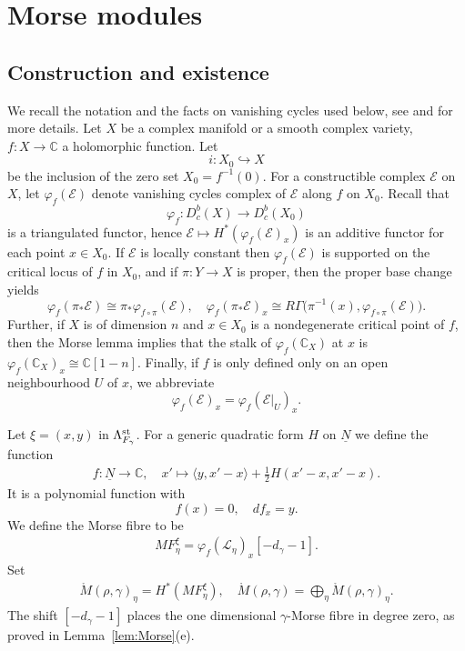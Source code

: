 \documentclass[11pt,reqno]{amsart}
\theoremstyle{definition}
\theoremstyle{remark}
\def\bbC{\mathbb C}
\def\dN{\underline N}
\def\calE{\mathcal E}
\begin{document}
\section{Morse modules}\label{sec:morse}

\subsection{Construction and existence}\label{subsec:vc}
We recall the notation and the facts on vanishing cycles used below, see \cite[\S4.2]{Dim04} and \cite[\S8.6]{KS90} for more details. 
Let $X$ be a complex
manifold or a smooth complex variety, $f:X\to\bbC$ a holomorphic function.
Let $$i:X_0\hookrightarrow X$$ 
be the inclusion of the zero set $X_0=f^{-1}(0)$.
For a constructible complex $\calE$ on $X$, let $\varphi_f(\calE)$
denote {vanishing cycles} complex of $\calE$ along $f$ on $X_0$.
Recall that 
$$\varphi_f:D^b_c(X)\to D^b_c(X_0)$$ is a triangulated functor, hence
$\calE\mapsto H^*(\varphi_f(\calE)_x)$ is an additive functor for each point $x\in X_0$.
If $\calE$ is locally constant then $\varphi_f(\calE)$ is supported on the critical locus of $f$ in $X_0$,
and if $\pi:Y\to X$ is proper, then the proper base change yields
$$\varphi_f(\pi_*\calE)\cong\pi_*\varphi_{f\circ\pi}(\calE)
,\quad
\varphi_f(\pi_*\calE)_x\cong R\Gamma\big(\pi^{-1}(x),\varphi_{f\circ\pi}(\calE)\big).$$
Further, if $X$ is  of dimension $n$ and $x\in X_0$ is a nondegenerate critical point of $f$, then the Morse lemma
implies that the stalk of $\varphi_f(\bbC_X)$ at $x$ is \(\varphi_f(\mathbb C_X)_x\cong\mathbb C[1-n]\). 
Finally, if $f$ is only defined only on an open neighbourhood $U$ of $x$, we abbreviate
$$\varphi_f(\calE)_x=\varphi_f(\calE|_U)_x.$$

Let $\xi=(x,y)$ in $\Lambda_{F_\gamma}^{\rm st}$. 
For a generic quadratic form $H$ on $\dN$ we define the function
\begin{align}\label{fH}
f:\dN\to\mathbb C,\quad
x'\mapsto\langle y,x'-x\rangle+\frac12H(x'-x,x'-x).\end{align} 
It is a polynomial function with 
$$f(x)=0,\quad df_x=y.$$
We define the Morse fibre to be
\begin{align}\label{MF}MF^\xi_\eta=\varphi_f(\mathscr L_\eta)_x[-d_\gamma-1].\end{align}
Set
\begin{align*}
\mathring M(\rho,\gamma)_\eta=H^*(MF^\xi_\eta),\quad
\mathring M(\rho,\gamma)=\bigoplus_\eta \mathring M(\rho,\gamma)_\eta.
\end{align*}
The shift $[-d_\gamma-1]$  places the one dimensional $\gamma$-Morse fibre in degree zero,
as proved in Lemma~\ref{lem:Morse}(e). 
\end{document}

